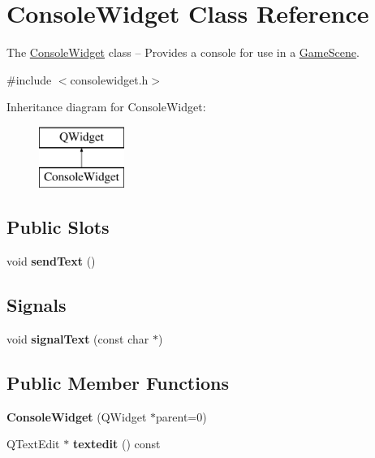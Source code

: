 \hypertarget{class_console_widget}{}\section{Console\+Widget Class Reference}
\label{class_console_widget}


The \hyperlink{class_console_widget}{Console\+Widget} class -- Provides a console for use in a \hyperlink{class_game_scene}{Game\+Scene}.  




{\ttfamily \#include $<$consolewidget.\+h$>$}

Inheritance diagram for Console\+Widget\+:\begin{figure}[H]
\begin{center}
\leavevmode
\includegraphics[height=2.000000cm]{class_console_widget}
\end{center}
\end{figure}
\subsection*{Public Slots}
\begin{DoxyCompactItemize}
\item 
\mbox{\label{class_console_widget_a25c9db0a82f572647288b738f1b1781d}} 
void {\bfseries send\+Text} ()
\end{DoxyCompactItemize}
\subsection*{Signals}
\begin{DoxyCompactItemize}
\item 
\mbox{\label{class_console_widget_a5ff85011eea230aefe8633b329d5132f}} 
void {\bfseries signal\+Text} (const char $\ast$)
\end{DoxyCompactItemize}
\subsection*{Public Member Functions}
\begin{DoxyCompactItemize}
\item 
\mbox{\label{class_console_widget_a4a66caaf3f7583a46ebe44a5c2221160}} 
{\bfseries Console\+Widget} (Q\+Widget $\ast$parent=0)
\item 
\mbox{\label{class_console_widget_a599f0a9577aa0f63e3aad3714de14925}} 
Q\+Text\+Edit $\ast$ {\bfseries textedit} () const
\end{DoxyCompactItemize}
